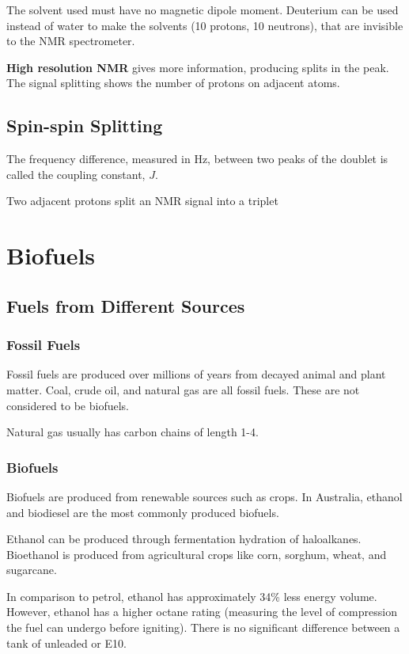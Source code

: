 	The solvent used must have no magnetic dipole moment. Deuterium can be used instead of water to make the solvents  (10 protons, 10 neutrons),  that are invisible to the NMR spectrometer.


	\textbf{High resolution NMR} gives more information, producing splits in the peak. The signal splitting shows the number of protons on adjacent atoms.

	\subsection{Spin-spin Splitting}
	
		The frequency difference, measured in Hz, between two peaks of the doublet is called the coupling constant, $J$.

		Two adjacent protons split an NMR signal into a triplet


\section{Biofuels}

	\subsection{Fuels from Different Sources}
	
		\subsubsection{Fossil Fuels}

			Fossil fuels are produced over millions of years from decayed animal and plant matter. Coal, crude oil, and natural gas are all fossil fuels. These are not considered to be biofuels.

			Natural gas usually has carbon chains of length 1-4.

		\subsubsection{Biofuels}
		
			Biofuels are produced from renewable sources such as crops. In Australia, ethanol and biodiesel are the most commonly produced biofuels.

			Ethanol can be produced through fermentation hydration of haloalkanes. Bioethanol is produced from agricultural crops like corn, sorghum, wheat, and sugarcane.

			In comparison to petrol, ethanol has approximately 34\% less energy volume. However, ethanol has a higher octane rating (measuring the level of compression the fuel can undergo before igniting). There is no significant difference between a tank of unleaded or E10.


